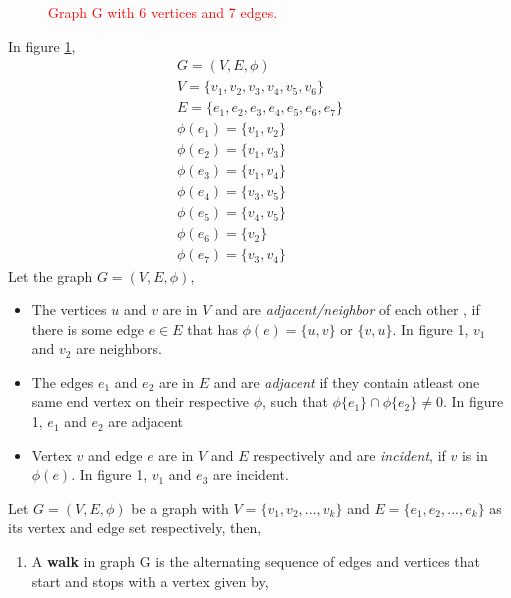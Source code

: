 \begin{itemize}
\begin{figure}[h!]
\caption{\textcolor{red}{Graph G with 6 vertices and 7 edges.}}
\label{graph1}
\end{figure}
In figure \ref{graph1}, 
\begin{equation}
\begin{array}{l}
G=(V,E,\phi) \\
V=\{v_1,v_2,v_3,v_4,v_5,v_6\} \\
E=\{e_1,e_2,e_3,e_4,e_5,e_6,e_7\} \\
\phi(e_1)=\{v_1,v_2\} \\
\phi(e_2)=\{v_1,v_3\} \\
\phi(e_3)=\{v_1,v_4\} \\
\phi(e_4)=\{v_3,v_5\} \\
\phi(e_5)=\{v_4,v_5\} \\
\phi(e_6)=\{v_2\} \\
\phi(e_7)=\{v_3,v_4\}
\end{array}
\end{equation}
\newpage
Let the graph $G=(V,E,\phi)$,
	\begin{itemize}
\item The vertices $u$ and $v$ are in $V$ and are \textit{adjacent/neighbor} of each other , if there is some edge $e \in E$ that has $\phi(e)=\{u,v\}$ or $\{v,u\}$. In figure 1, $v_1$ and $v_2$ are neighbors.
\item The edges $e_1$ and $e_2$ are in $E$ and are \textit{adjacent} if they contain atleast one same end vertex on their respective $\phi$, such that $\phi\{e_1\} \cap \phi\{e_2\} \neq 0$. In figure 1, $e_1$ and $e_2$ are adjacent
\item Vertex $v$ and edge $e$ are in $V$ and $E$ respectively and are \textit{incident}, if $v$ is in $\phi(e)$. In figure 1, $v_1$ and $e_3$ are incident.
\end{itemize}
Let $G=(V,E,\phi)$ be a graph with $V=\{v_1,v_2,...,v_k\}$ and $E=\{e_1,e_2,...,e_k\}$ as its vertex and edge set respectively, then,
\begin{enumerate}
	\item A \textbf{walk} in graph G is the alternating sequence of edges and vertices that start and stops with a vertex given by,

\end{enumerate}
\end{itemize}
